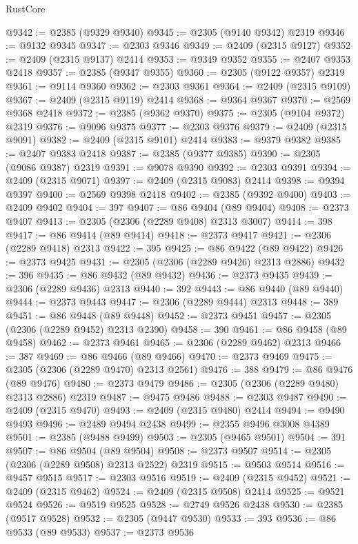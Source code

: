 \begin{lexlean}{RustCore}
\begin{coremodule}
@9342 := @2385 (@9329 @9340)
@9345 := @2305 (@9140 @9342) @2319
@9346 := @9132 @9345
@9347 := @2303 @9346
@9349 := @2409 (@2315 @9127)
@9352 := @2409 (@2315 @9137) @2414
@9353 := @9349 @9352
@9355 := @2407 @9353 @2418
@9357 := @2385 (@9347 @9355)
@9360 := @2305 (@9122 @9357) @2319
@9361 := @9114 @9360
@9362 := @2303 @9361
@9364 := @2409 (@2315 @9109)
@9367 := @2409 (@2315 @9119) @2414
@9368 := @9364 @9367
@9370 := @2569 @9368 @2418
@9372 := @2385 (@9362 @9370)
@9375 := @2305 (@9104 @9372) @2319
@9376 := @9096 @9375
@9377 := @2303 @9376
@9379 := @2409 (@2315 @9091)
@9382 := @2409 (@2315 @9101) @2414
@9383 := @9379 @9382
@9385 := @2407 @9383 @2418
@9387 := @2385 (@9377 @9385)
@9390 := @2305 (@9086 @9387) @2319
@9391 := @9078 @9390
@9392 := @2303 @9391
@9394 := @2409 (@2315 @9071)
@9397 := @2409 (@2315 @9083) @2414
@9398 := @9394 @9397
@9400 := @2569 @9398 @2418
@9402 := @2385 (@9392 @9400)
@9403 := @2409 @9402
@9404 := 397
@9407 := @86 @9404 (@89 @9404)
@9408 := @2373 @9407
@9413 := @2305 (@2306 (@2289 @9408) @2313 @3007)
@9414 := 398
@9417 := @86 @9414 (@89 @9414)
@9418 := @2373 @9417
@9421 := @2306 (@2289 @9418) @2313
@9422 := 395
@9425 := @86 @9422 (@89 @9422)
@9426 := @2373 @9425
@9431 := @2305 (@2306 (@2289 @9426) @2313 @2886)
@9432 := 396
@9435 := @86 @9432 (@89 @9432)
@9436 := @2373 @9435
@9439 := @2306 (@2289 @9436) @2313
@9440 := 392
@9443 := @86 @9440 (@89 @9440)
@9444 := @2373 @9443
@9447 := @2306 (@2289 @9444) @2313
@9448 := 389
@9451 := @86 @9448 (@89 @9448)
@9452 := @2373 @9451
@9457 := @2305 (@2306 (@2289 @9452) @2313 @2390)
@9458 := 390
@9461 := @86 @9458 (@89 @9458)
@9462 := @2373 @9461
@9465 := @2306 (@2289 @9462) @2313
@9466 := 387
@9469 := @86 @9466 (@89 @9466)
@9470 := @2373 @9469
@9475 := @2305 (@2306 (@2289 @9470) @2313 @2561)
@9476 := 388
@9479 := @86 @9476 (@89 @9476)
@9480 := @2373 @9479
@9486 := @2305 (@2306 (@2289 @9480) @2313 @2886) @2319
@9487 := @9475 @9486
@9488 := @2303 @9487
@9490 := @2409 (@2315 @9470)
@9493 := @2409 (@2315 @9480) @2414
@9494 := @9490 @9493
@9496 := @2489 @9494 @2438
@9499 := @2355 @9496 @3008 @4389
@9501 := @2385 (@9488 @9499)
@9503 := @2305 (@9465 @9501)
@9504 := 391
@9507 := @86 @9504 (@89 @9504)
@9508 := @2373 @9507
@9514 := @2305 (@2306 (@2289 @9508) @2313 @2522) @2319
@9515 := @9503 @9514
@9516 := @9457 @9515
@9517 := @2303 @9516
@9519 := @2409 (@2315 @9452)
@9521 := @2409 (@2315 @9462)
@9524 := @2409 (@2315 @9508) @2414
@9525 := @9521 @9524
@9526 := @9519 @9525
@9528 := @2749 @9526 @2438
@9530 := @2385 (@9517 @9528)
@9532 := @2305 (@9447 @9530)
@9533 := 393
@9536 := @86 @9533 (@89 @9533)
@9537 := @2373 @9536

\end{coremodule}
\end{lexlean}
